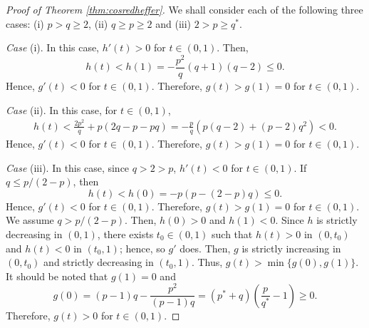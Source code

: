 \documentclass[12pt]{amsart}
\numberwithin{equation}{section}
\theoremstyle{plain}
\theoremstyle{definition}
\theoremstyle{remark}
\begin{document}
\begin{proof}[Proof of Theorem \ref{thm:cosredheffer}]
We shall consider each of the following three cases:
(i) $p>q \geq 2$, (ii) $q \geq p \geq 2$
and (iii) $2>p \geq q^*$.

\textit{Case} (i).
In this case, $h'(t)>0$ for $t \in (0,1)$.
Then, 
\[h(t)<h(1)=-\frac{p^2}{q}(q+1)(q-2) \leq 0.\]
Hence, $g'(t)<0$ for $t \in (0,1)$.
Therefore, $g(t)>g(1)=0$ for $t \in (0,1)$.

\textit{Case} (ii).
In this case, for $t \in (0,1)$,
\begin{align*}
h(t)
<\frac{2p^2}{q}+p(2q-p-pq)
=-\frac{p}{q}(p(q-2)+(p-2)q^2)<0.
\end{align*}
Hence, $g'(t)<0$ for $t \in (0,1)$.
Therefore, $g(t)>g(1)=0$ for $t \in (0,1)$.

\textit{Case} (iii).
In this case, since $q>2>p$, $h'(t)<0$ for 
$t \in (0,1)$. 
If $q \leq p/(2-p)$, then 
\[h(t)<h(0)=-p(p-(2-p)q) \leq 0.\]
Hence, $g'(t)<0$ for $t \in (0,1)$.
Therefore, $g(t)>g(1)=0$ for $t \in (0,1)$.
We assume $q >p/(2-p)$. Then,
$h(0) >0$ and $h(1)<0$.
Since $h$ is strictly decreasing in $(0,1)$,
there exists $t_0 \in (0,1)$ such that 
$h(t)>0$ in $(0,t_0)$ and $h(t)<0$ in $(t_0,1)$;
hence, so $g'$ does. Then, $g$ is strictly increasing
in $(0,t_0)$ and strictly decreasing in $(t_0,1)$.
Thus, $g(t)>\min\{g(0),g(1)\}$.
It should be noted that $g(1)=0$ and 
\[g(0)=(p-1)q-\frac{p^2}{(p-1)q}
=(p^*+q)\left(\frac{p}{q^*}-1\right) \geq 0.\] 
Therefore, $g(t)>0$ for $t \in (0,1)$.
\end{proof}









\end{document}
